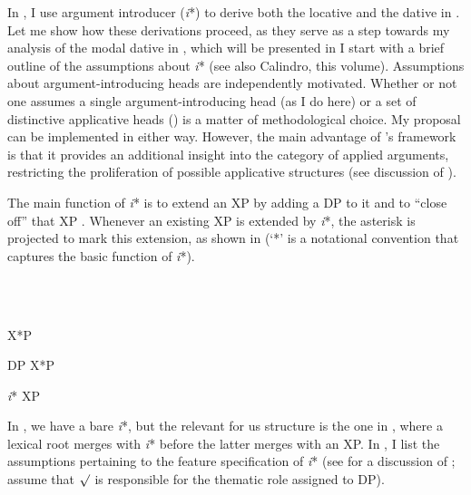 \documentclass[output=paper,colorlinks,citecolor=brown]{./langscibook}
\begin{document}
In \citet{TsedrykInPress}, I use  argument introducer (\textit{i}*) to derive both the locative and the dative in . Let me show how these derivations proceed, as they serve as a step towards my analysis of the modal dative in , which will be presented in  I start with a brief outline of the assumptions about \textit{i}* (see also Calindro, this volume). Assumptions about argument-introducing heads are independently motivated. Whether or not one assumes a single argument-introducing head (as I do here) or a set of distinctive applicative heads (\citealt{Pylkkänen2008, Cuervo2003, Markman2009}) is a matter of methodological choice. My proposal can be implemented in either way. However, the main advantage of \citeauthor{WoodMarantz2017}’s framework is that it provides an additional insight into the category of applied arguments, restricting the proliferation of possible applicative structures (see discussion of ).       

The main function of \textit{i}* is to extend an XP by adding a DP to it and to “close off” that XP \citep[258]{WoodMarantz2017}. Whenever an existing XP is extended by \textit{i}*, the asterisk is projected to mark this extension, as shown in  (‘*’ is a notational convention that captures the basic function of \textit{i}*). 

\ea%
    \label{ex:tsedryk:14}
    \gll\\
        \\
    \glt
    \z

          X*P

  DP  X*P


  \textit{i}*  XP

In , we have a bare \textit{i}*, but the relevant for us structure is the one in , where a lexical root merges with \textit{i}* before the latter merges with an XP. In , I list the assumptions pertaining to the feature specification of \textit{i}* (see \citealt{TsedrykInPress} for a discussion of ; \citeauthor{WoodMarantz2017} assume that  ${\surd}$  is responsible for the thematic role assigned to DP).  

\ea%
    \label{ex:tsedryk:15}
    \gll\\
        \\
    \glt
    \z
\end{document}
